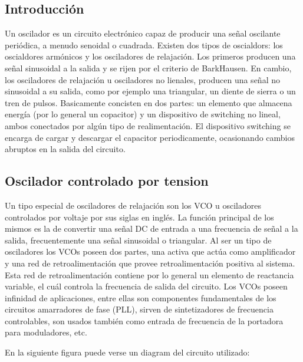


\subsection{Introducción}

Un oscilador es un circuito electrónico capaz de producir una señal oscilante periódica, a menudo senoidal o cuadrada. Existen dos tipos de oscialdors: los oscialdores armónicos y los osciladores de relajación. Los primeros producen una señal sinusoidal a la salida y se rijen por el criterio de BarkHausen. En cambio, los osciladores de relajación u osciladores no lienales, producen una señal no sinusoidal a su salida, como por ejemplo una triangular, un diente de sierra o un tren de pulsos. Basicamente concisten en dos partes: un elemento que almacena energía (por lo general un copacitor) y un dispositivo de switching no lineal, ambos conectados por algún tipo de realimentación. El dispositivo switching se encarga de cargar y descargar el capacitor periodicamente, ocasionando cambios abruptos en la salida del circuito. 


\subsection{Oscilador controlado por tension}

Un tipo especial de osciladores de relajación son los VCO u osciladores controlados por voltaje por sus siglas en inglés. La función principal de los mismos es la de convertir una señal DC de entrada a una frecuencia de señal a la salida, frecuentemente una señal sinusoidal o triangular. Al ser un tipo de osciladores los VCOs poseen dos partes, una activa que actúa como amplificador y una red de retroalimentación que provee retroalimentación positiva al sistema. Esta red de retroalimentación contiene por lo general un elemento de reactancia variable, el cuál controla la frecuencia de salida del circuito. 
Los VCOs poseen infinidad de aplicaciones, entre ellas son componentes fundamentales de los circuitos amarradores de fase (PLL), sirven de sintetizadores de frecuencia controlables, son usados también como entrada de frecuencia de la portadora para moduladores, etc.


En la siguiente figura puede verse un diagram del circuito utilizado:

